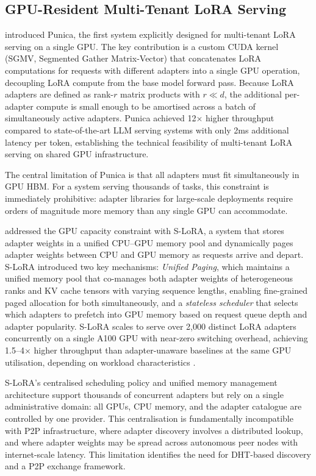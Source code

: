 \subsection{GPU-Resident Multi-Tenant LoRA Serving}
\label{sec:inference_systems:punica}

\citet{Chen2023Punica} introduced Punica, the first system explicitly designed for
multi-tenant LoRA serving on a single GPU. The key contribution is a custom CUDA kernel
(SGMV, Segmented Gather Matrix-Vector) that concatenates LoRA computations for requests with different adapters into
a single GPU operation, decoupling LoRA compute from the base model forward pass.
Because LoRA adapters are defined as rank-$r$ matrix products with $r \ll d$, the
additional per-adapter compute is small enough to be amortised across a batch of
simultaneously active adapters. Punica achieved 12$\times$ higher throughput compared to state-of-the-art LLM serving
systems with only 2ms additional latency per token, establishing the technical
feasibility of multi-tenant LoRA serving on shared GPU infrastructure.

The central limitation of Punica is that all adapters must fit simultaneously in GPU HBM.
For a system serving thousands of tasks, this constraint is immediately prohibitive:
adapter libraries for large-scale deployments require orders of magnitude more memory
than any single GPU can accommodate.

\citet{Sheng2024} addressed the GPU capacity constraint with S-LoRA, a system that
stores adapter weights in a unified CPU--GPU memory pool and dynamically pages adapter
weights between CPU and GPU memory as requests arrive and depart. S-LoRA introduced
two key mechanisms: \textit{Unified Paging}, which maintains a unified memory pool that co-manages both adapter weights of
heterogeneous ranks and KV cache tensors with varying sequence lengths, enabling
fine-grained paged allocation for both simultaneously, and a \textit{stateless scheduler} that selects which adapters to
prefetch into GPU memory based on request queue depth and adapter popularity. S-LoRA
scales to serve over 2,000 distinct LoRA adapters concurrently on a single A100 GPU
with near-zero switching overhead, achieving 1.5--4$\times$ higher throughput than
adapter-unaware baselines at the same GPU utilisation, depending on workload
characteristics \citep{Sheng2024}.

S-LoRA's centralised scheduling policy and unified memory management architecture support
thousands of concurrent adapters but rely on a single administrative domain: all GPUs,
CPU memory, and the adapter catalogue are controlled by one provider. This centralisation
is fundamentally incompatible with P2P infrastructure, where adapter discovery involves
a distributed lookup, and where adapter weights may be spread across autonomous peer
nodes with internet-scale latency. This limitation identifies the need for DHT-based
discovery and a P2P exchange framework.

